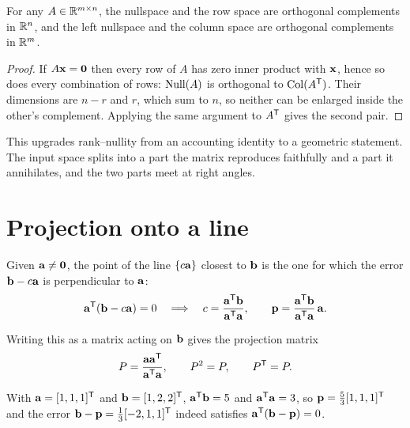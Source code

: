 \begin{theorem}
For any \(A\in\mathbb{R}^{m\times n}\), the nullspace and the row space are orthogonal
complements in \(\mathbb{R}^{n}\), and the left nullspace and the column space are
orthogonal complements in \(\mathbb{R}^{m}\).
\end{theorem}

\begin{proof}
If \(A\mathbf{x}=\mathbf{0}\) then every row of \(A\) has zero inner product with
\(\mathbf{x}\), hence so does every combination of rows: \(\operatorname{Null}(A)\) is orthogonal
to \(\operatorname{Col}(A^{\mathsf{T}})\). Their dimensions are \(n-r\) and \(r\), which sum to \(n\), so
neither can be enlarged inside the other's complement. Applying the same
argument to \(A^{\mathsf{T}}\) gives the second pair.
\end{proof}

\begin{remark}
This upgrades rank--nullity from an accounting identity to a geometric
statement. The input space splits into a part the matrix reproduces faithfully
and a part it annihilates, and the two parts meet at right angles.
\end{remark}

\section{Projection onto a line}

Given \(\mathbf{a}\neq\mathbf{0}\), the point of the line \(\{c\mathbf{a}\}\) closest
to \(\mathbf{b}\) is the one for which the error \(\mathbf{b}-c\mathbf{a}\) is
perpendicular to \(\mathbf{a}\):
\[
	\mathbf{a}^{\mathsf{T}}(\mathbf{b}-c\mathbf{a})=0
	\quad\Longrightarrow\quad
	c=\frac{\mathbf{a}^{\mathsf{T}}\mathbf{b}}{\mathbf{a}^{\mathsf{T}}\mathbf{a}},
	\qquad
	\mathbf{p}=\frac{\mathbf{a}^{\mathsf{T}}\mathbf{b}}{\mathbf{a}^{\mathsf{T}}\mathbf{a}}\,\mathbf{a}.
\]

Writing this as a matrix acting on \(\mathbf{b}\) gives the projection matrix
\[
	P=\frac{\mathbf{a}\mathbf{a}^{\mathsf{T}}}{\mathbf{a}^{\mathsf{T}}\mathbf{a}},
	\qquad
	P^{2}=P,\qquad P^{\mathsf{T}}=P .
\]


\begin{example}
With \(\mathbf{a}=[1,1,1]^{\mathsf{T}}\) and \(\mathbf{b}=[1,2,2]^{\mathsf{T}}\),
\(\mathbf{a}^{\mathsf{T}}\mathbf{b}=5\) and \(\mathbf{a}^{\mathsf{T}}\mathbf{a}=3\), so
\(\mathbf{p}=\tfrac{5}{3}[1,1,1]^{\mathsf{T}}\) and the error
\(\mathbf{b}-\mathbf{p}=\tfrac{1}{3}[-2,1,1]^{\mathsf{T}}\) indeed satisfies
\(\mathbf{a}^{\mathsf{T}}(\mathbf{b}-\mathbf{p})=0\).
\end{example}

